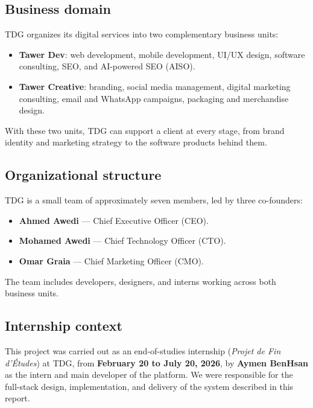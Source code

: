 \subsection{Business domain}

TDG organizes its digital services into two complementary business units:

\begin{itemize}
  \item \textbf{Tawer Dev}: web development, mobile development, UI/UX design, software
    consulting, SEO, and AI-powered SEO (AISO).
  \item \textbf{Tawer Creative}: branding, social media management, digital marketing consulting,
    email and WhatsApp campaigns, packaging and merchandise design.
\end{itemize}

With these two units, TDG can support a client at every stage, from brand identity and
marketing strategy to the software products behind them.

\subsection{Organizational structure}

TDG is a small team of approximately seven members, led by three co-founders:

\begin{itemize}
  \item \textbf{Ahmed Awedi} --- Chief Executive Officer (CEO).
  \item \textbf{Mohamed Awedi} --- Chief Technology Officer (CTO).
  \item \textbf{Omar Graia} --- Chief Marketing Officer (CMO).
\end{itemize}

The team includes developers, designers, and interns working across both business units.

\subsection{Internship context}

This project was carried out as an end-of-studies internship (\emph{Projet de Fin d'Études}) at
TDG, from \textbf{February 20 to July 20, 2026}, by \textbf{Aymen BenHsan} as the intern and
main developer of the platform. We were responsible for the full-stack design, implementation,
and delivery of the system described in this report.

